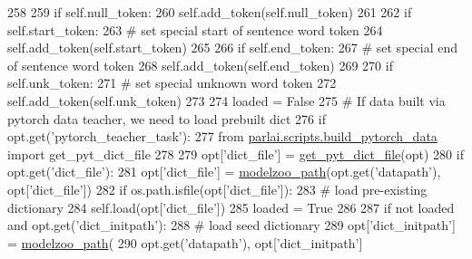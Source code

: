 \begin{DoxyCode}
258 
259             \textcolor{keywordflow}{if} self.null\_token:
260                 self.add\_token(self.null\_token)
261 
262             \textcolor{keywordflow}{if} self.start\_token:
263                 \textcolor{comment}{# set special start of sentence word token}
264                 self.add\_token(self.start\_token)
265 
266             \textcolor{keywordflow}{if} self.end\_token:
267                 \textcolor{comment}{# set special end of sentence word token}
268                 self.add\_token(self.end\_token)
269 
270             \textcolor{keywordflow}{if} self.unk\_token:
271                 \textcolor{comment}{# set special unknown word token}
272                 self.add\_token(self.unk\_token)
273 
274             loaded = \textcolor{keyword}{False}
275             \textcolor{comment}{# If data built via pytorch data teacher, we need to load prebuilt dict}
276             \textcolor{keywordflow}{if} opt.get(\textcolor{stringliteral}{'pytorch\_teacher\_task'}):
277                 \textcolor{keyword}{from} \hyperlink{namespaceparlai_1_1scripts_1_1build__pytorch__data}{parlai.scripts.build\_pytorch\_data} \textcolor{keyword}{import} 
      get\_pyt\_dict\_file
278 
279                 opt[\textcolor{stringliteral}{'dict\_file'}] = \hyperlink{namespaceparlai_1_1scripts_1_1build__pytorch__data_a6ec85a5842150af78f5178d75075b0cc}{get\_pyt\_dict\_file}(opt)
280             \textcolor{keywordflow}{if} opt.get(\textcolor{stringliteral}{'dict\_file'}):
281                 opt[\textcolor{stringliteral}{'dict\_file'}] = \hyperlink{namespaceparlai_1_1agents_1_1legacy__agents_1_1seq2seq_1_1utils__v0_a5fbd3301b67f00d6d146fb01c7cd7626}{modelzoo\_path}(opt.get(\textcolor{stringliteral}{'datapath'}), opt[\textcolor{stringliteral}{'dict\_file'}])
282                 \textcolor{keywordflow}{if} os.path.isfile(opt[\textcolor{stringliteral}{'dict\_file'}]):
283                     \textcolor{comment}{# load pre-existing dictionary}
284                     self.load(opt[\textcolor{stringliteral}{'dict\_file'}])
285                     loaded = \textcolor{keyword}{True}
286 
287             \textcolor{keywordflow}{if} \textcolor{keywordflow}{not} loaded \textcolor{keywordflow}{and} opt.get(\textcolor{stringliteral}{'dict\_initpath'}):
288                 \textcolor{comment}{# load seed dictionary}
289                 opt[\textcolor{stringliteral}{'dict\_initpath'}] = \hyperlink{namespaceparlai_1_1agents_1_1legacy__agents_1_1seq2seq_1_1utils__v0_a5fbd3301b67f00d6d146fb01c7cd7626}{modelzoo\_path}(
290                     opt.get(\textcolor{stringliteral}{'datapath'}), opt[\textcolor{stringliteral}{'dict\_initpath'}]

\end{DoxyCode}
